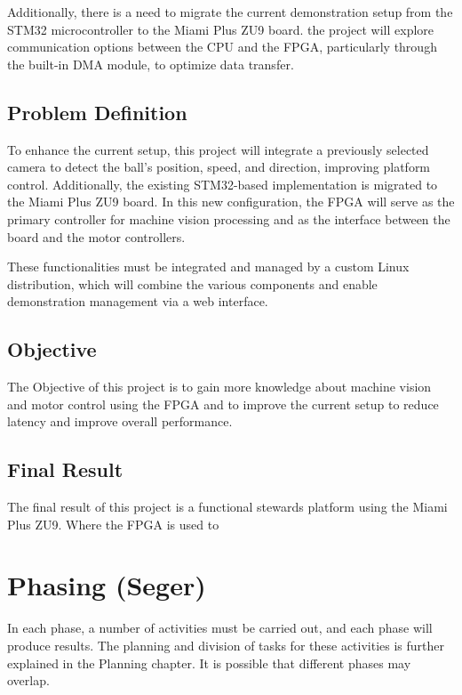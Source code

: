 \documentclass{article}
\begin{document}
Additionally, there is a need to migrate the current demonstration setup from
the STM32 microcontroller to the Miami Plus ZU9 board.
the project will explore communication options between the CPU and the FPGA,
particularly through the built-in DMA module, to optimize data transfer.

\subsection{Problem Definition} 

To enhance the current setup, this project will
integrate a previously selected camera to detect the ball's position, speed, and
direction, improving platform control. Additionally, the existing STM32-based
implementation is migrated to the Miami Plus ZU9 board. In this new
configuration, the FPGA will serve as the primary controller for machine vision
processing and as the interface between the board and the motor controllers.

These functionalities must be integrated and managed by a custom
Linux distribution, which will combine the various components and enable
demonstration management via a web interface.

\subsection{Objective}
The Objective of this project is to gain more knowledge about machine vision and motor control using the FPGA 
and to improve the current setup to reduce latency and improve overall performance.
\subsection{Final Result}
The final result of this project is a functional stewards platform using the Miami Plus ZU9.
Where the FPGA is used to 

\newpage
\section{Phasing (Seger)}
In each phase, a number of activities must be carried out, and each phase will produce results.
The planning and division of tasks for these activities is further explained in the Planning chapter.
It is possible that different phases may overlap.
\end{document}
